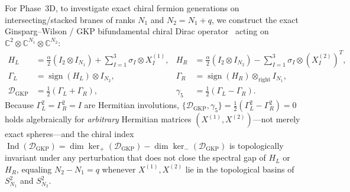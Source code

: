 \documentclass[11pt,a4paper]{article}
\DeclareMathOperator{\sign}{sign}
\begin{document}
For Phase~3D, to investigate exact chiral fermion generations on intersecting/stacked branes of ranks $N_1$ and $N_2 = N_1 + q$, we construct the exact Ginsparg--Wilson / GKP bifundamental chiral Dirac operator~\cite{Grosse1996,CarowWatamura1997} acting on $\mathbb{C}^2 \otimes \mathbb{C}^{N_1} \otimes \mathbb{C}^{N_2}$:
\begin{align}
  H_L &= \frac{\alpha}{2} (I_2 \otimes I_{N_1}) + \sum_{I=1}^{3} \sigma_I \otimes X^{(1)}_I,
  &
  H_R &= \frac{\alpha}{2} (I_2 \otimes I_{N_2}) - \sum_{I=1}^{3} \sigma_I \otimes (X^{(2)}_I)^T, \\
  \Gamma_L &= \sign(H_L) \otimes I_{N_2},
  &
  \Gamma_R &= \sign(H_R) \otimes_{\mathrm{right}} I_{N_1}, \label{eq:gkp_gamma}\\
  \mathcal{D}_{\mathrm{GKP}} &= \frac{1}{2}(\Gamma_L + \Gamma_R),
  &
  \gamma_5 &= \frac{1}{2}(\Gamma_L - \Gamma_R). \label{eq:gkp_dirac}
\end{align}
Because $\Gamma_L^2 = \Gamma_R^2 = I$ are Hermitian involutions, $\{\mathcal{D}_{\mathrm{GKP}}, \gamma_5\} = \frac{1}{2}(\Gamma_L^2 - \Gamma_R^2) = 0$ holds algebraically for \emph{arbitrary} Hermitian matrices $(X^{(1)}, X^{(2)})$---not merely exact spheres---and the chiral index $\operatorname{Ind}(\mathcal{D}_{\mathrm{GKP}}) = \dim\ker_{+}(\mathcal{D}_{\mathrm{GKP}}) - \dim\ker_{-}(\mathcal{D}_{\mathrm{GKP}})$ is topologically invariant under any perturbation that does not close the spectral gap of $H_L$ or $H_R$, equaling $N_2 - N_1 = q$ whenever $X^{(1)}, X^{(2)}$ lie in the topological basins of $S^2_{N_1}$ and $S^2_{N_2}$.
\end{document}
